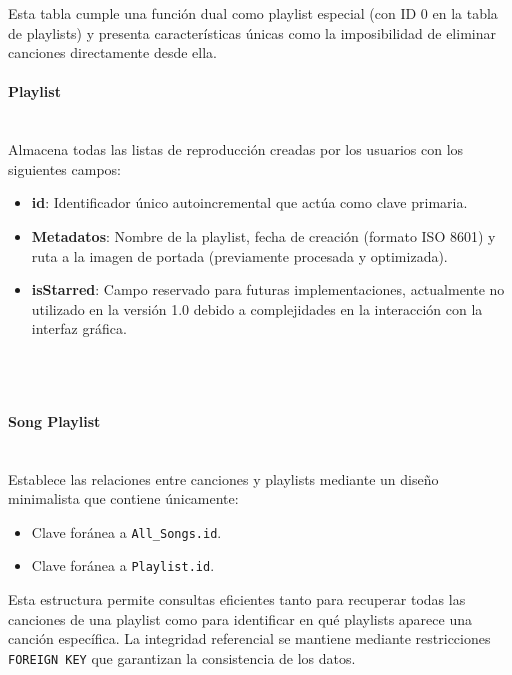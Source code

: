 \documentclass[11pt, a4paper]{article}
\begin{document}
              Esta tabla cumple una función dual como playlist especial (con ID 0 en la tabla de playlists) y presenta características únicas como la imposibilidad de eliminar canciones directamente desde ella.

              \paragraph{Playlist}
              ‎ \\

              Almacena todas las listas de reproducción creadas por los usuarios con los siguientes campos:

              \begin{itemize}
                \item \textbf{id}: Identificador único autoincremental que actúa como clave primaria.
                \item \textbf{Metadatos}: Nombre de la playlist, fecha de creación (formato ISO 8601) y ruta a la imagen de portada (previamente procesada y optimizada).
                \item \textbf{isStarred}: Campo reservado para futuras implementaciones, actualmente no utilizado en la versión 1.0 debido a complejidades en la interacción con la interfaz gráfica.
              \end{itemize}

              ‎ \\ \\ 

              \paragraph{Song Playlist}
              ‎ \\

              Establece las relaciones entre canciones y playlists mediante un diseño minimalista que contiene únicamente:

              \begin{itemize}
                \item Clave foránea a \texttt{All\_Songs.id}.
                \item Clave foránea a \texttt{Playlist.id}.
              \end{itemize}

              Esta estructura permite consultas eficientes tanto para recuperar todas las canciones de una playlist como para identificar en qué playlists aparece una canción específica. La integridad referencial se mantiene mediante restricciones \texttt{FOREIGN KEY} que garantizan la consistencia de los datos.
\end{document}
